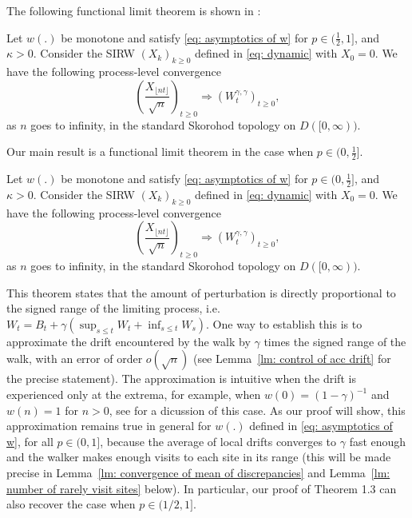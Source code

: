 \documentclass[EJP]{ejpecp} %
\begin{document}

	The following functional limit theorem is shown in \cite{KMP23}: 
	\begin{theorem}
		Let $w(.)$ be monotone and satisfy \eqref{eq: asymptotics of w} for $p\in (\frac{1}{2},1]$, and $\kappa >0 $. Consider the SIRW $(X_k)_{k\geq 0}$ defined in \eqref{eq: dynamic} with $X_0 =0$. We have the following process-level convergence
		\[
		\left(  \frac{X_{\lfloor nt \rfloor }}{\sqrt{n}}  \right)_{t\geq 0} \Longrightarrow \left( W^{\gamma,\gamma}_{t}\right)_{t\geq 0},
		\] 
		as $n$ goes to infinity, in the standard Skorohod topology on $D([0,\infty) ).$
	\end{theorem}
\begin{samepage}
	Our main result is a functional limit theorem in the case when $p\in (0,\frac{1}{2}]$.
	\begin{theorem}\label{th: main}
		Let $w(.)$ be monotone and satisfy \eqref{eq: asymptotics of w} for $p\in (0,\frac{1}{2}]$, and $\kappa >0 $. Consider the SIRW $(X_k)_{k\geq 0}$ defined in \eqref{eq: dynamic} with $X_0 =0$. We have the following process-level convergence
		\[
		\left(  \frac{X_{\lfloor nt \rfloor }}{\sqrt{n}}  \right)_{t\geq 0} \Longrightarrow \left( W^{\gamma,\gamma}_{t}\right)_{t\geq 0},
		\]
		as $n$ goes to infinity, in the standard Skorohod topology on $D([0,\infty) ).$
	\end{theorem}
\end{samepage}

This theorem states that the amount of perturbation is directly proportional to the signed range of the limiting process, i.e. $W_t = B_t + \gamma \left( \sup_{s \le t} W_t + \inf _{s \le t} W_s \right) $. 
One way to establish this is to approximate the drift encountered by the walk by $\gamma$ times the signed range of the walk, with an error of order $o\left(\sqrt{n} \right)$ (see Lemma~\ref{lm: control of acc drift} for the precise statement). 
The approximation is intuitive when the drift is experienced only at the extrema, for example, when $w(0) = (1 - \gamma)^{-1}$ and $w(n) = 1$ for $n > 0$, see \cite{Dav99} for a dicussion of this case. 
As our proof will show, this approximation remains true in general for $w(.)$ defined in \eqref{eq: asymptotics of w}, for all $p \in (0,1]$, because the average of local drifts converges to $\gamma$ fast enough and the walker makes enough visits to each site in its range (this will be made precise in Lemma~\ref{lm: convergence of mean of discrepancies} and Lemma~\ref{lm: number of rarely visit sites} below).
In particular, our proof of Theorem 1.3 can also recover the case when $p\in (1/2,1]$.
\end{document}
